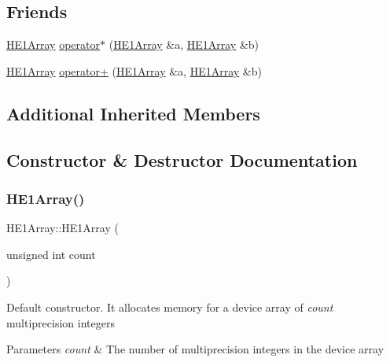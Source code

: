 \subsection*{Friends}
\begin{DoxyCompactItemize}
\item 
\hyperlink{classHE1Array}{H\+E1\+Array} \hyperlink{classHE1Array_a9af458afd1fae2464406a71868d411d9}{operator$\ast$} (\hyperlink{classHE1Array}{H\+E1\+Array} \&a, \hyperlink{classHE1Array}{H\+E1\+Array} \&b)
\item 
\hyperlink{classHE1Array}{H\+E1\+Array} \hyperlink{classHE1Array_aaa51e336d1bca00b78a39445cc9525ec}{operator+} (\hyperlink{classHE1Array}{H\+E1\+Array} \&a, \hyperlink{classHE1Array}{H\+E1\+Array} \&b)
\end{DoxyCompactItemize}
\subsection*{Additional Inherited Members}


\subsection{Constructor \& Destructor Documentation}
\mbox{\label{classHE1Array_a99381587cd348b91f90a94fe5b25a3a3}} 
\subsubsection{\texorpdfstring{H\+E1\+Array()}{HE1Array()}\hspace{0.1cm}{\footnotesize\ttfamily [1/6]}}
{\footnotesize\ttfamily H\+E1\+Array\+::\+H\+E1\+Array (\begin{DoxyParamCaption}\item[{unsigned int}]{count }\end{DoxyParamCaption})}

Default constructor. It allocates memory for a device array of {\itshape count} multiprecision integers 
\begin{DoxyParams}{Parameters}
{\em count} & The number of multiprecision integers in the device array \\
\hline
\end{DoxyParams}
\mbox{\label{classHE1Array_a8c961c822603135c972b7fefc555f560}} 
